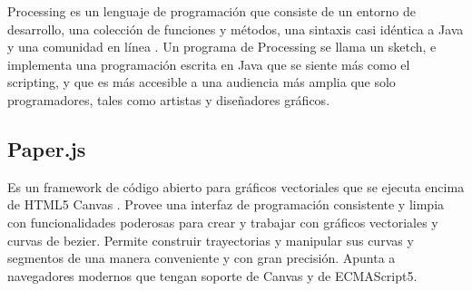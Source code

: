 Processing es un lenguaje de programación que consiste de un entorno de desarrollo, una colección de funciones y métodos, una sintaxis casi idéntica a Java y una comunidad en línea \cite{Fry07}. Un programa de Processing se llama un sketch, e implementa una programación escrita en Java que se siente más como el scripting, y que es más accesible a una audiencia más amplia que solo programadores, tales como artistas y diseñadores gráficos.


\subsection{Paper.js}

Es un framework de código abierto para gráficos vectoriales que se ejecuta encima de HTML5 Canvas \cite{PaperJS}. Provee una interfaz de programación consistente y limpia con funcionalidades poderosas para crear y trabajar con gráficos vectoriales y curvas de bezier. Permite construir trayectorias y manipular sus curvas y segmentos de una manera conveniente y con gran precisión. Apunta a navegadores modernos que tengan soporte de Canvas y de ECMAScript5.
